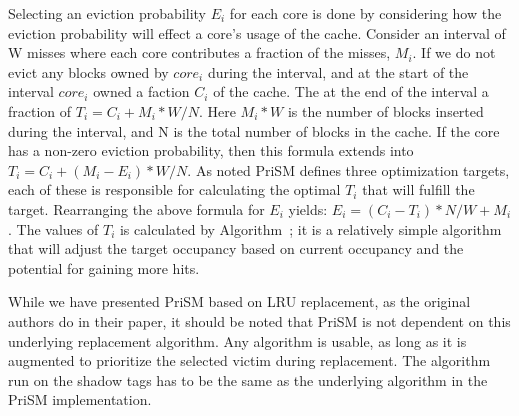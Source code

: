 Selecting an eviction probability $E_i$ for each core is done by considering how the eviction probability will effect a core's usage of the cache.
Consider an interval of W misses where each core contributes a fraction of the misses, $M_i$.
If we do not evict any blocks owned by $core_i$ during the interval, and at the start of the interval $core_i$ owned a faction $C_i$ of the cache.
The at the end of the interval a fraction of $T_i = C_i + M_i * W/N$. 
Here $M_i * W$ is the number of blocks inserted during the interval, and N is the total number of blocks in the cache.
If the core has a non-zero eviction probability, then this formula extends into $T_i = C_i + (M_i - E_i) * W/N$.
As noted PriSM defines three optimization targets, each of these is responsible for calculating the optimal $T_i$ that will fulfill the target.
Rearranging the above formula for $E_i$ yields: $E_i = (C_i - T_i) * N/W + M_i$.
The values of $T_i$ is calculated by Algorithm~; it is a relatively simple algorithm that will adjust the target occupancy based on current occupancy and the potential for gaining more hits.

While we have presented PriSM based on LRU replacement, as the original authors do in their paper, it should be noted that PriSM is not dependent on this underlying replacement algorithm.
Any algorithm is usable, as long as it is augmented to prioritize the selected victim during replacement.
The algorithm run on the shadow tags has to be the same as the underlying algorithm in the PriSM implementation.

